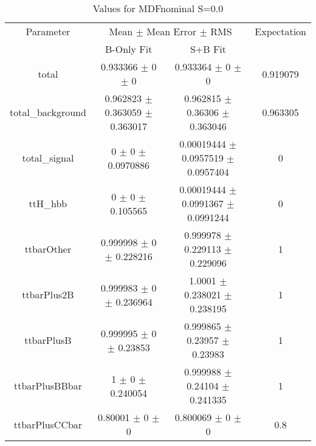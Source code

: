 \begin{table}
\centering
\caption{Values for MDFnominal S=0.0}
\begin{tabular}{cccc}
\toprule
Parameter & \multicolumn{2}{c}{Mean $\pm$ Mean Error $\pm$ RMS} & Expectation\\
 & B-Only Fit & S+B Fit & \\
\midrule
total & \num{0.933366} $\pm$ \num{0} $\pm$ \num{0} & \num{0.933364} $\pm$ \num{0} $\pm$ \num{0} & \num{0.919079}\\
total\_background & \num{0.962823} $\pm$ \num{0.363059} $\pm$ \num{0.363017} & \num{0.962815} $\pm$ \num{0.36306} $\pm$ \num{0.363046} & \num{0.963305}\\
total\_signal & \num{0} $\pm$ \num{0} $\pm$ \num{0.0970886} & \num{0.00019444} $\pm$ \num{0.0957519} $\pm$ \num{0.0957404} & \num{0}\\
ttH\_hbb & \num{0} $\pm$ \num{0} $\pm$ \num{0.105565} & \num{0.00019444} $\pm$ \num{0.0991367} $\pm$ \num{0.0991244} & \num{0}\\
ttbarOther & \num{0.999998} $\pm$ \num{0} $\pm$ \num{0.228216} & \num{0.999978} $\pm$ \num{0.229113} $\pm$ \num{0.229096} & \num{1}\\
ttbarPlus2B & \num{0.999983} $\pm$ \num{0} $\pm$ \num{0.236964} & \num{1.0001} $\pm$ \num{0.238021} $\pm$ \num{0.238195} & \num{1}\\
ttbarPlusB & \num{0.999995} $\pm$ \num{0} $\pm$ \num{0.23853} & \num{0.999865} $\pm$ \num{0.23957} $\pm$ \num{0.23983} & \num{1}\\
ttbarPlusBBbar & \num{1} $\pm$ \num{0} $\pm$ \num{0.240054} & \num{0.999988} $\pm$ \num{0.24104} $\pm$ \num{0.241335} & \num{1}\\
ttbarPlusCCbar & \num{0.80001} $\pm$ \num{0} $\pm$ \num{0} & \num{0.800069} $\pm$ \num{0} $\pm$ \num{0} & \num{0.8}\\
\bottomrule
\end{tabular}
\end{table}
